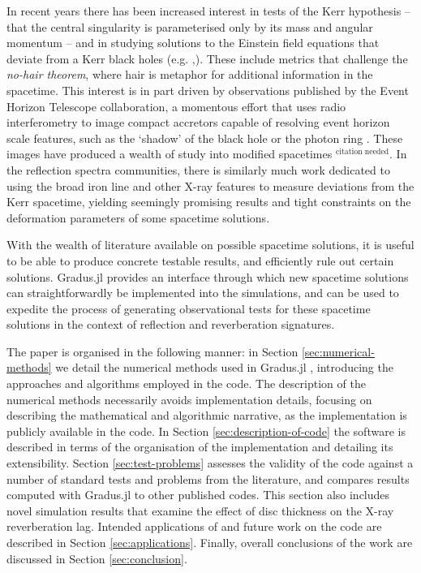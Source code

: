 \documentclass[fleqn,usenatbib]{mnras}
\newcommand{\citneeded}{{\bf \color{red} $^{\text{citation needed}}$}}
\newcommand{\Gradus}{Gradus.jl }
\begin{document}
In recent years there has been increased interest in tests of the Kerr
hypothesis -- that the central singularity is parameterised only by its mass and
angular momentum -- and in studying solutions to the Einstein field equations
that deviate from a Kerr black holes (e.g. \citealt{johannsen_testing_2010,
chrusciel_stationary_2012, bambi_testing_2022, patra_accretion_2023,
chen_observational_2024},). These include metrics that challenge the
\textit{no-hair theorem}, where hair is metaphor for additional information in
the spacetime. This interest is in part driven by observations published by the
Event Horizon Telescope collaboration, a momentous effort that uses radio
interferometry to image compact accretors capable of resolving event horizon
scale features, such as the `shadow' of the black hole or the photon ring
\citep{the_event_horizon_telescope_collaboration_first_2019,
the_event_horizon_telescope_collaboration_first_2023}. These
images have produced a wealth of study into modified spacetimes\citneeded. In the
reflection spectra communities, there is similarly much work dedicated to using
the broad iron line and other X-ray features to measure deviations from the Kerr
spacetime, yielding seemingly promising results and tight constraints on the
deformation parameters of some spacetime solutions.

With the wealth of literature available on possible spacetime solutions, it is
useful to be able to produce concrete testable results, and efficiently rule out
certain solutions. \Gradus provides an interface through which new spacetime
solutions can straightforwardly be implemented into the simulations, and can be
used to expedite the process of generating observational tests for these
spacetime solutions in the context of reflection and reverberation signatures.

The paper is organised in the following manner: in Section
\ref{sec:numerical-methods} we detail the numerical methods used in \Gradus,
introducing the approaches and algorithms employed in the code. The description
of the numerical methods necessarily avoids implementation details, focusing on
describing the mathematical and algorithmic narrative, as the implementation is
publicly available in the code. In Section \ref{sec:description-of-code} the
software is described in terms of the organisation of the implementation and
detailing its extensibility. Section \ref{sec:test-problems} assesses the
validity of the code against a number of standard tests and problems from the
literature, and compares results computed with \Gradus to other published codes.
This section also includes novel simulation results that examine the effect of
disc thickness on the X-ray reverberation lag. Intended applications of and
future work on the code are described in Section \ref{sec:applications}.
Finally, overall conclusions of the work are discussed in Section
\ref{sec:conclusion}.
\end{document}
